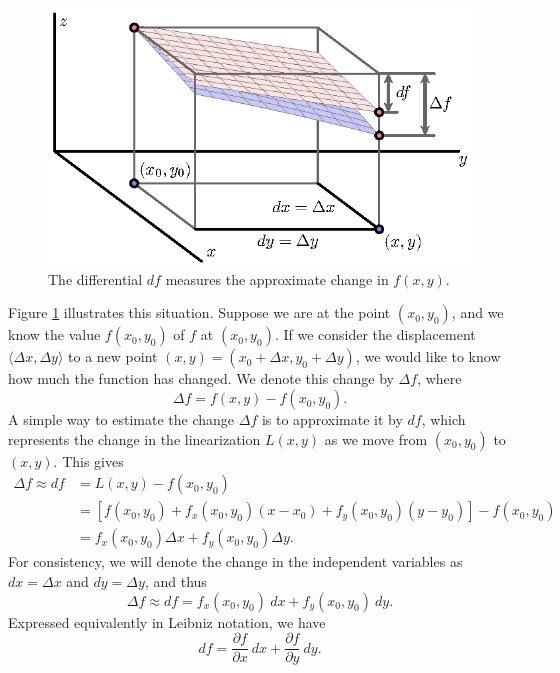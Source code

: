 \begin{figure}[ht]
  \begin{center}
    \includegraphics{figures/fig_10_4_tangent_10.eps}
  \end{center}
  \caption{The differential $df$ measures the approximate change in
    $f(x,y)$.} 
  \label{F:10.4.differential}
\end{figure}

Figure \ref{F:10.4.differential} illustrates this situation.  Suppose
we are at the point $(x_0,y_0)$, and we know the value $f(x_0,y_0)$ of $f$ at $(x_0,y_0)$.  If we consider the displacement $\langle \Delta x, \Delta
y\rangle$ to a new point $(x,y) = (x_0+\Delta x, y_0
+ \Delta y)$, we would like to know how much the function has changed.
We denote this change by $\Delta f$, where
$$
\Delta f = f(x,y) - f(x_0, y_0).
$$
A simple way to estimate the change $\Delta f$ is to approximate it by
$df$, which represents the change in the linearization $L(x,y)$ as we move from
$(x_0,y_0)$ to $(x,y)$.  This gives
\begin{align*}
  \Delta f \approx df &= L(x,y)-f(x_0, y_0)  \\
  &= [f(x_0,y_0)+ f_x(x_0,y_0)(x-x_0) +
  f_y(x_0,y_0)(y-y_0)] - f(x_0, y_0) \\
  &= f_x(x_0,y_0)\Delta x + f_y(x_0, y_0)\Delta y. 
\end{align*}
For consistency, we will denote the
change in the independent variables as $dx = \Delta x$ and $dy =
\Delta y$, and thus
\begin{equation}
  \Delta f \approx df = f_x(x_0,y_0)~dx + f_y(x_0,y_0)~dy.
  \label{E:10.4.differential}
\end{equation}
Expressed equivalently in Leibniz notation, we have
\begin{equation}
  df = \frac{\partial f}{\partial x}~dx + \frac{\partial f}{\partial
    y}~dy.
  \label{E:10.4.differential.leib}
\end{equation}


